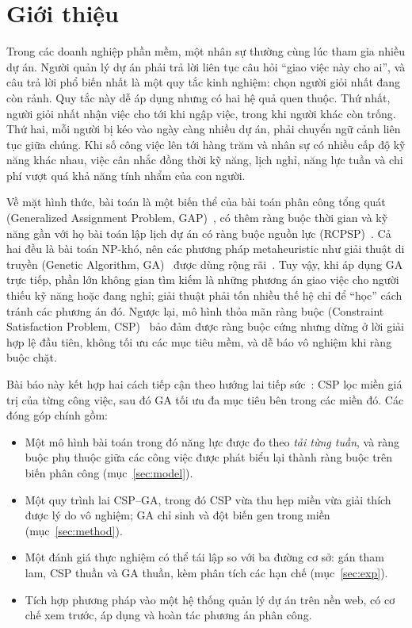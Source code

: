 \documentclass{IEEEtran}
\begin{document}
\section{Giới thiệu}
\label{sec:intro}

Trong các doanh nghiệp phần mềm, một nhân sự thường cùng lúc tham gia nhiều dự án. Người quản lý dự án phải trả lời liên tục câu hỏi ``giao việc này cho ai'', và câu trả lời phổ biến nhất là một quy tắc kinh nghiệm: chọn người giỏi nhất đang còn rảnh. Quy tắc này dễ áp dụng nhưng có hai hệ quả quen thuộc. Thứ nhất, người giỏi nhất nhận việc cho tới khi ngập việc, trong khi người khác còn trống. Thứ hai, mỗi người bị kéo vào ngày càng nhiều dự án, phải chuyển ngữ cảnh liên tục giữa chúng. Khi số công việc lên tới hàng trăm và nhân sự có nhiều cấp độ kỹ năng khác nhau, việc cân nhắc đồng thời kỹ năng, lịch nghỉ, năng lực tuần và chi phí vượt quá khả năng tính nhẩm của con người.

Về mặt hình thức, bài toán là một biến thể của bài toán phân công tổng quát (Generalized Assignment Problem, GAP)~\cite{ross1975}, có thêm ràng buộc thời gian và kỹ năng gần với họ bài toán lập lịch dự án có ràng buộc nguồn lực (RCPSP)~\cite{hartmann2010}. Cả hai đều là bài toán NP-khó, nên các phương pháp metaheuristic như giải thuật di truyền (Genetic Algorithm, GA)~\cite{holland1975,goldberg1989} được dùng rộng rãi~\cite{chu1997,kolisch2006}. Tuy vậy, khi áp dụng GA trực tiếp, phần lớn không gian tìm kiếm là những phương án giao việc cho người thiếu kỹ năng hoặc đang nghỉ; giải thuật phải tốn nhiều thế hệ chỉ để ``học'' cách tránh các phương án đó. Ngược lại, mô hình thỏa mãn ràng buộc (Constraint Satisfaction Problem, CSP)~\cite{russell2020,rossi2006} bảo đảm được ràng buộc cứng nhưng dừng ở lời giải hợp lệ đầu tiên, không tối ưu các mục tiêu mềm, và dễ báo vô nghiệm khi ràng buộc chặt.

Bài báo này kết hợp hai cách tiếp cận theo hướng lai tiếp sức~\cite{talbi2002}: CSP lọc miền giá trị của từng công việc, sau đó GA tối ưu đa mục tiêu bên trong các miền đó. Các đóng góp chính gồm:
\begin{itemize}
  \item Một mô hình bài toán trong đó năng lực được đo theo \emph{tải từng tuần}, và ràng buộc phụ thuộc giữa các công việc được phát biểu lại thành ràng buộc trên biến phân công (mục~\ref{sec:model}).
  \item Một quy trình lai CSP--GA, trong đó CSP vừa thu hẹp miền vừa giải thích được lý do vô nghiệm; GA chỉ sinh và đột biến gen trong miền (mục~\ref{sec:method}).
  \item Một đánh giá thực nghiệm có thể tái lập so với ba đường cơ sở: gán tham lam, CSP thuần và GA thuần, kèm phân tích các hạn chế (mục~\ref{sec:exp}).
  \item Tích hợp phương pháp vào một hệ thống quản lý dự án trên nền web, có cơ chế xem trước, áp dụng và hoàn tác phương án phân công.
\end{itemize}
\end{document}
